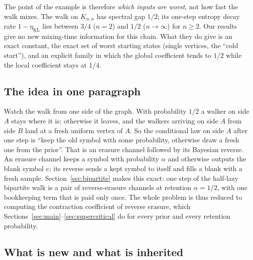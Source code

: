 \documentclass[11pt,a4paper]{article}
\numberwithin{equation}{section}
\theoremstyle{definition}
\theoremstyle{remark}
\newcommand{\etaKL}{\eta_{\mathrm{KL}}}
\begin{document}
The point of the example is therefore \emph{which inputs are worst}, not how
fast the walk mixes. The walk on \(K_{n,n}\) has spectral gap \(1/2\); its
one-step entropy decay rate \(1-\etaKL\) lies between \(3/4\) (\(n=2\)) and
\(1/2\) (\(n\to\infty\)) for \(n\ge2\). Our results give no new mixing-time information
for this chain. What they do give is an exact constant, the exact set of
worst starting states (single vertices, the ``cold start''), and an explicit
family in which the global coefficient tends to \(1/2\) while the local
coefficient stays at \(1/4\).

\subsection{The idea in one paragraph}

Watch the walk from one side of the graph. With probability \(1/2\) a
walker on side \(A\) stays where it is; otherwise it leaves, and the walkers
arriving on side \(A\) from side \(B\) land at a fresh uniform vertex of
\(A\). So the conditional law on side \(A\) after one step is ``keep the old
symbol with some probability, otherwise draw a fresh one from the prior''.
That is an erasure channel followed by its Bayesian reverse. An erasure channel keeps
a symbol with probability \(\alpha\) and otherwise outputs the blank symbol
\(e\); its reverse sends a kept symbol to itself and fills a blank with a
fresh sample. Section~\ref{sec:bipartite} makes this exact: one step of the
half-lazy bipartite walk is a pair of reverse-erasure channels at retention
\(\alpha=1/2\), with one bookkeeping term that is paid only once. The whole
problem is thus reduced to computing the contraction coefficient of reverse
erasure, which Sections~\ref{sec:main}--\ref{sec:supercritical} do for
every prior and every retention probability.

\subsection{What is new and what is inherited}
\end{document}
